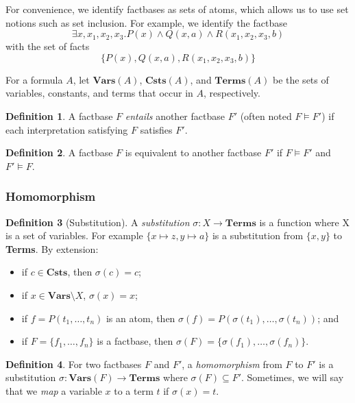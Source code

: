 \documentclass{article}
\theoremstyle{definition}
\newtheorem{definition}{Definition}[section]
\theoremstyle{remark}
\newcommand{\Vars}{\textbf{Vars}}
\newcommand{\Terms}{\textbf{Terms}}
\newcommand{\Csts}{\textbf{Csts}}
\begin{document}
For convenience, we identify factbases as sets of atoms, which allows us to  use  set  notions  such  as  set inclusion. For example, we identify the factbase $$\exists x,x_{1},x_{2},x_{3}. P(x) \land Q(x,a) \land R(x_{1},x_{2},x_{3},b)$$ with the set of facts $$\{P(x),Q(x,a),R(x_{1},x_{2},x_{3},b)\}$$

For a formula $A$, let \emph{$\Vars(A)$}, \emph{$\Csts(A)$}, and \emph{$\Terms(A)$} be the sets of variables, constants, and terms that occur in $A$, respectively.

\begin{definition}
A factbase $F$ \emph{entails} another factbase $F'$ (often noted $F \models F'$) if each interpretation satisfying $F$ satisfies $F'$.
\end{definition}	

\begin{definition}
A factbase $F$ is equivalent to another factbase $F'$ if $F \models F'$ and $F' \models F$.
\end{definition}

\subsubsection{Homomorphism}

\begin{definition}[Substitution]
A \emph{substitution} $\sigma:X \to \Terms$ is a function where X is a set of variables. For example $\{x \mapsto z, y \mapsto a \}$ is a substitution from $\{x,y\}$ to \Terms. By extension: 
\begin{itemize}
\item if $c \in \Csts$, then $\sigma(c) = c$;
\item if $x \in \Vars \setminus X$, $\sigma(x) = x$;
\item if $f = P(t_1,\ldots,t_n)$ is an atom, then $\sigma(f) = P(\sigma(t_1),\ldots,\sigma(t_n))$; and
\item if $F = \{f_1,\ldots,f_n\}$ is a factbase, then $\sigma(F) = \{\sigma(f_1),\ldots,\sigma(f_n)\}$.
\end{itemize}
\end{definition}

\begin{definition}
For two factbases $F$ and $F'$, a \emph{homomorphism} from $F$ to $F'$ is a substitution $\sigma:\Vars(F) \to \Terms$ where $\sigma(F) \subseteq F'$. Sometimes, we will say that we \emph{map} a variable $x$ to a term $t$ if $\sigma(x)=t$.
\end{definition}
\end{document}
